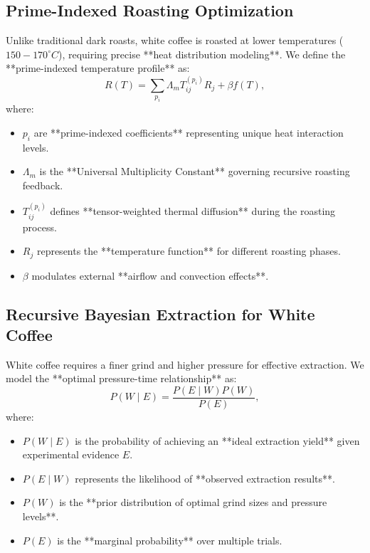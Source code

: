 \documentclass{article}
\theoremstyle{plain}
\theoremstyle{claimstyle}
\begin{document}
\subsection{Prime-Indexed Roasting Optimization}
Unlike traditional dark roasts, white coffee is roasted at lower temperatures (\(150-170^\circ C\)), requiring precise **heat distribution modeling**. We define the **prime-indexed temperature profile** as:
\begin{equation}
R(T) = \sum_{p_i} \Lambda_m T_{ij}^{(p_i)} R_j + \beta f(T),
\end{equation}
where:
\begin{itemize}
    \item \( p_i \) are **prime-indexed coefficients** representing unique heat interaction levels.
    \item \( \Lambda_m \) is the **Universal Multiplicity Constant** governing recursive roasting feedback.
    \item \( T_{ij}^{(p_i)} \) defines **tensor-weighted thermal diffusion** during the roasting process.
    \item \( R_j \) represents the **temperature function** for different roasting phases.
    \item \( \beta \) modulates external **airflow and convection effects**.
\end{itemize}

\subsection{Recursive Bayesian Extraction for White Coffee}
White coffee requires a finer grind and higher pressure for effective extraction. We model the **optimal pressure-time relationship** as:
\begin{equation}
P(W \mid E) = \frac{P(E \mid W) P(W)}{P(E)},
\end{equation}
where:
\begin{itemize}
    \item \( P(W \mid E) \) is the probability of achieving an **ideal extraction yield** given experimental evidence \( E \).
    \item \( P(E \mid W) \) represents the likelihood of **observed extraction results**.
    \item \( P(W) \) is the **prior distribution of optimal grind sizes and pressure levels**.
    \item \( P(E) \) is the **marginal probability** over multiple trials.
\end{itemize}
\end{document}
